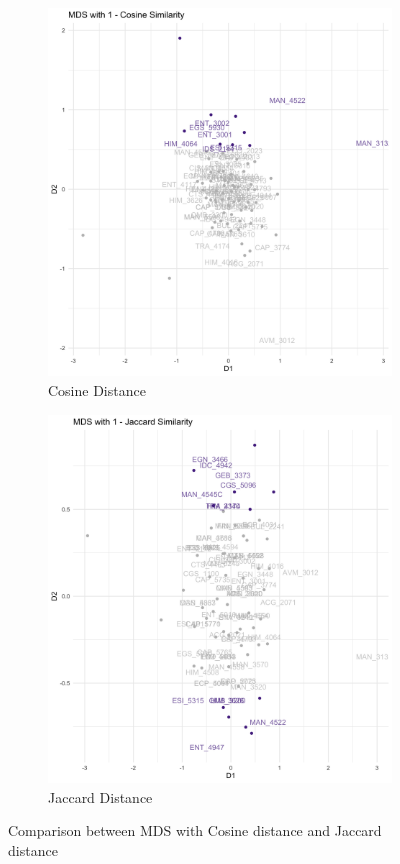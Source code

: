 \begin{figure}[H]
\centering
\begin{subfigure}{.5\textwidth}
  \centering
  \includegraphics[width=1\linewidth]{Content/images/cos_mds.png}
  \caption{Cosine Distance}
  \label{fig:cmds}
\end{subfigure}%
\begin{subfigure}{.5\textwidth}
  \centering
  \includegraphics[width=1\linewidth]{Content/images/jac_mds.png}
  \caption{Jaccard Distance}
  \label{fig:jmds}
\end{subfigure}
\caption{Comparison between MDS with Cosine distance and Jaccard distance}
\label{fig:tile2}
\end{figure}

